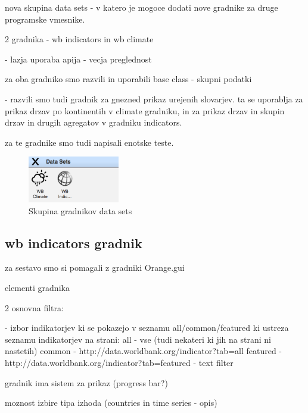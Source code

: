  
nova skupina data sets 
 - v katero je mogoce dodati nove gradnike za druge programske vmesnike.

2 gradnika - wb indicators in wb climate

- lazja uporaba apija
- vecja preglednost


za oba gradniko smo razvili in uporabili base class - skupni podatki

- razvili smo tudi gradnik za gnezned prikaz urejenih slovarjev.
  ta se uporablja za prikaz drzav po kontinentih v climate gradniku,
  in za prikaz drzav in skupin drzav in drugih agregatov v gradniku
  indicators.


za te gradnike smo tudi napisali enotske teste.


\begin{figure}
  \begin{center}
    \includegraphics[width=4cm]{pic/data_sets_group.png}
  \end{center}
  \caption{Skupina gradnikov data sets}
  \label{drevo}
\end{figure} 


\subsection{wb indicators gradnik}

za sestavo smo si pomagali z gradniki Orange.gui 

elementi gradnika

2 osnovna filtra: 

- izbor indikatorjev ki se pokazejo v seznamu all/common/featured 
  ki ustreza seznamu indikatorjev na strani: 
  all - vse (tudi nekateri ki jih na strani ni nastetih)
  common - http://data.worldbank.org/indicator?tab=all
  featured - http://data.worldbank.org/indicator?tab=featured
- text filter

gradnik ima sistem za prikaz (progress bar?) 

moznost izbire tipa izhoda (countries in time series - opis)

